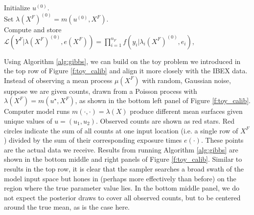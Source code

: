 \documentclass[11pt]{article}
\begin{document}
\begin{algorithm}[ht]
\DontPrintSemicolon
Initialize $u^{(0)}$. \\
Set $\lambda(X^F)^{(0)} = m(u^{(0)}, X^F)$. \\
Compute and store $\mathcal{L}(Y^F|\lambda(X^F)^{(0)}, e(X^F)) =
\prod_{i=1}^{n_F} f(y_i|\lambda_i(X^F)^{(0)}, e_i)$, \\
\caption{MCMC (Metropolis-within-Gibbs) for Poisson Bayesian inverse problems}
\label{alg:gibbs}
\end{algorithm}

Using Algorithm \ref{alg:gibbs}, we can build on the toy problem we introduced
in {\color{red}the top row of} Figure \ref{f:toy_calib} and align it more
closely with the IBEX data. Instead of observing a mean process $\mu(X^F)$
with random, Gaussian noise, suppose we are given counts, drawn from a Poisson
process with $\lambda(X^F) = m(u^\star, X^F)$, as shown in the
{\color{red}bottom} left panel of Figure \ref{f:toy_calib}. Computer model
runs $m(\cdot,\cdot) = \lambda(X)$ produce different mean surfaces given
unique values of $u = (u_1, u_2)$. Observed counts are shown as red stars. Red
circles indicate the sum of all counts at one input location (i.e. a single
row of $X^F$) divided by the sum of their corresponding exposure times
$e(\cdot)$. These points are the actual data we receive. Results from running
Algorithm \ref{alg:gibbs} are shown in the {\color{red}bottom} middle and
right panels of Figure \ref{f:toy_calib}. Similar to results in {\color{red}
the top row}, it is clear that the sampler searches a broad swath of the model
input space but hones in {\color{red}(perhaps more effectively than before)}
on the region where the true parameter value lies. {\color{red}In the bottom
middle panel, we do not expect the posterior draws to cover all observed
counts, but to be centered around the true mean, as is the case here.}
\end{document}

